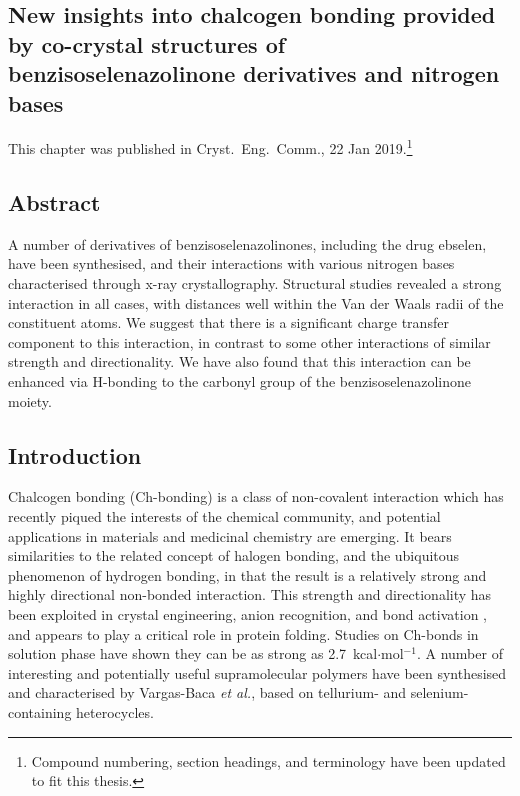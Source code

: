\begin{refsection}

    \chapter[Insights from co-crystal structures]{New insights into chalcogen bonding provided by co-crystal structures of benzisoselenazolinone derivatives and nitrogen bases}\label{ch:crystengcomm1}
    
    This chapter was published in Cryst.\ Eng.\ Comm., 22 Jan 2019\autocite{Fellowes2019}.\footnote{Compound numbering, section headings, and terminology have been updated to fit this thesis.}
    
    \section{Abstract}
    A number of derivatives of benzisoselenazolinones, including the drug ebselen, have been synthesised, and their interactions with various nitrogen bases characterised through x-ray crystallography.
    Structural studies revealed a strong interaction in all cases, with  distances well within the Van der Waals radii of the constituent atoms.
    We suggest that there is a significant charge transfer component to this interaction, in contrast to some other interactions of similar strength and directionality.
    We have also found that this interaction can be enhanced via H-bonding to the carbonyl group of the benzisoselenazolinone moiety.
    
    
    \section{Introduction}
    Chalcogen bonding (Ch-bonding) is a class of non-covalent interaction which has recently piqued the interests of the chemical community, and potential applications in materials and medicinal chemistry are emerging.\autocite{Mitchell2017,Wonner2017a,Fanfrlik2014,Vogel2019}
    It bears similarities to the related concept of halogen bonding, and the ubiquitous phenomenon of hydrogen bonding, in that the result is a relatively strong and highly directional non-bonded interaction.\autocite{Paolo1974}
    This strength and directionality has been exploited in crystal engineering\autocite{Gleiter2003,Kremer2016,Huynh2017}, anion recognition\autocite{Lim2017,Lim2018,Garrett2016}, and bond activation \autocite{Wonner2017,Benz2017,Benz2017a}, and appears to play a critical role in protein folding.\autocite{Iwaoka2001,Iwaoka2015}
    Studies on  Ch-bonds in solution phase have shown they can be as strong as 2.7~kcal$\cdot$mol$^{-1}$\autocite{Garrett2015a}.
    A number of interesting and potentially useful supramolecular polymers have been synthesised and characterised by Vargas-Baca \textit{et al.}, based on tellurium- and selenium-containing heterocycles.\autocite{Ho2016,Ho2017}
    

\end{refsection}
